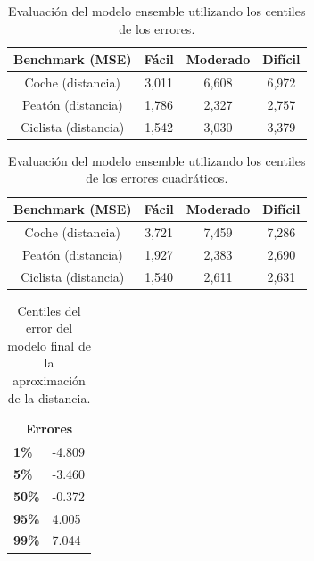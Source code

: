 \begin{table}[H]
\centering
\begin{tabular}{|c|c|c|c|}
\hline
\textbf{Benchmark (MSE)} & \textbf{Fácil} & \textbf{Moderado} & \textbf{Difícil}\\ \hline \hline
Coche (distancia)        & 3,011          & 6,608             & 6,972\\ \hline
Peatón (distancia)       & 1,786          & 2,327             & 2,757\\ \hline
Ciclista (distancia)     & 1,542          & 3,030             & 3,379\\ \hline
\end{tabular}
\caption{Evaluación del modelo ensemble utilizando los centiles de los errores.}
\label{fig:Evaluación del modelo ensemble utilizando los centiles de los errores.}
\end{table}

\begin{table}[H]
\centering
\begin{tabular}{|c|c|c|c|}
\hline
\textbf{Benchmark (MSE)} & \textbf{Fácil} & \textbf{Moderado} & \textbf{Difícil}\\ \hline \hline
Coche (distancia)        & 3,721          & 7,459             & 7,286\\ \hline
Peatón (distancia)       & 1,927          & 2,383             & 2,690\\ \hline
Ciclista (distancia)     & 1,540          & 2,611             & 2,631\\ \hline
\end{tabular}
\caption{Evaluación del modelo ensemble utilizando los centiles de los errores cuadráticos.}
\label{fig:Evaluación del modelo ensemble utilizando los centiles de los errores cuadráticos.}
\end{table}

\begin{table}[H]
\centering
\begin{tabular}{|ll|}
\hline
\multicolumn{2}{|c|}{\textbf{Errores}}       \\ \hline
\multicolumn{1}{|l|}{\textbf{1\%}}  & -4.809 \\ \hline
\multicolumn{1}{|l|}{\textbf{5\%}}  & -3.460 \\ \hline
\multicolumn{1}{|l|}{\textbf{50\%}} & -0.372 \\ \hline
\multicolumn{1}{|l|}{\textbf{95\%}} & 4.005  \\ \hline
\multicolumn{1}{|l|}{\textbf{99\%}} & 7.044  \\ \hline
\end{tabular}
\caption{Centiles del error del modelo final de la aproximación de la distancia.}
\label{fig:Centiles del modelo final de la aproximación de la distancia.}
\end{table}

